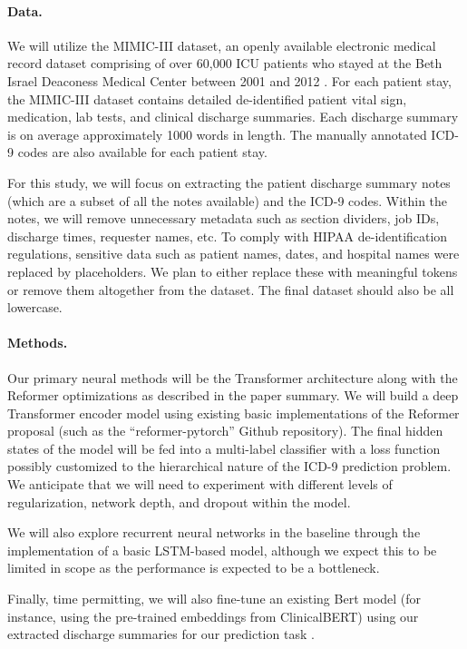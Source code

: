 \documentclass{article}
\begin{document}
\paragraph{Data.}
We will utilize the MIMIC-III dataset, an openly available electronic medical record dataset comprising of over 60,000 ICU patients who stayed at the Beth Israel Deaconess Medical Center between 2001 and 2012 \cite{johnson2016mimic}. For each patient stay, the MIMIC-III dataset contains detailed de-identified patient vital sign, medication, lab tests, and clinical discharge summaries. Each discharge summary is on average approximately 1000 words in length. The manually annotated ICD-9 codes are also available for each patient stay. 

For this study, we will focus on extracting the patient discharge summary notes (which are a subset of all the notes available) and the ICD-9 codes. Within the notes, we will remove unnecessary metadata such as section dividers, job IDs, discharge times, requester names, etc. To comply with HIPAA de-identification regulations, sensitive data such as patient names, dates, and hospital names were replaced by placeholders. We plan to either replace these with meaningful tokens or remove them altogether from the dataset. The final dataset should also be all lowercase. 


\paragraph{Methods.}
Our primary neural methods will be the Transformer architecture along with the Reformer optimizations as described in the paper summary. We will build a deep Transformer encoder model using existing basic implementations of the Reformer proposal (such as the “reformer-pytorch” Github repository). The final hidden states of the model will be fed into a multi-label classifier with a loss function possibly customized to the hierarchical nature of the ICD-9 prediction problem. We anticipate that we will need to experiment with different levels of regularization, network depth, and dropout within the model. 

We will also explore recurrent neural networks in the baseline through the implementation of a basic LSTM-based model, although we expect this to be limited in scope as the performance is expected to be a bottleneck. 

Finally, time permitting, we will also fine-tune an existing Bert model (for instance, using the pre-trained embeddings from ClinicalBERT) using our extracted discharge summaries for our prediction task \cite{alsentzer2019publicly}. 
\end{document}
